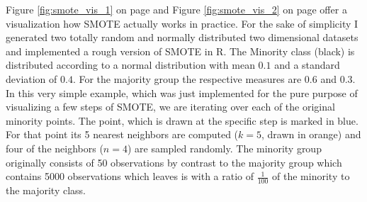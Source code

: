 \documentclass[12pt,a4paper]{article}
\begin{document}
Figure \ref{fig:smote_vis_1} on page \pageref{fig:smote_vis_1} and Figure \ref{fig:smote_vis_2} on page \pageref{fig:smote_vis_2} offer a visualization how SMOTE actually works in practice. For the sake of simplicity I generated two totally random and normally distributed two dimensional datasets and implemented a rough version of SMOTE in R. The Minority class (black) is distributed according to a normal distribution with mean $0.1$ and a standard deviation of $0.4$. For the majority group the respective measures are $0.6$ and $0.3$. In this very simple example, which was just implemented for the pure purpose of visualizing a few steps of SMOTE, we are iterating over each of the original minority points. The point, which is drawn at the specific step is marked in blue. For that point its 5 nearest neighbors are computed ($k=5$, drawn in orange) and four of the neighbors ($n=4$) are sampled randomly. The minority group originally consists of 50 observations by contrast to the majority group which contains 5000 observations which leaves is with a ratio of $\frac{1}{100}$ of the minority to the majority class. 
\end{document}
